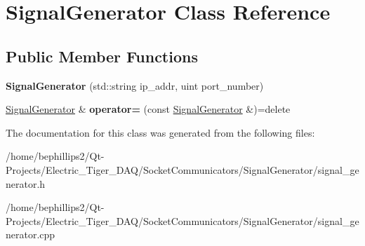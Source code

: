 \hypertarget{class_signal_generator}{}\section{Signal\+Generator Class Reference}
\label{class_signal_generator}
\subsection*{Public Member Functions}
\begin{DoxyCompactItemize}
\item 
{\bfseries Signal\+Generator} (std\+::string ip\+\_\+addr, uint port\+\_\+number)\hypertarget{class_signal_generator_a8e6b4d36b320d50961f83761c5811567}{}\label{class_signal_generator_a8e6b4d36b320d50961f83761c5811567}

\item 
\hyperlink{class_signal_generator}{Signal\+Generator} \& {\bfseries operator=} (const \hyperlink{class_signal_generator}{Signal\+Generator} \&)=delete\hypertarget{class_signal_generator_a4ee427365a76d62d3645f707cf1baf72}{}\label{class_signal_generator_a4ee427365a76d62d3645f707cf1baf72}

\end{DoxyCompactItemize}


The documentation for this class was generated from the following files\+:\begin{DoxyCompactItemize}
\item 
/home/bephillips2/\+Qt-\/\+Projects/\+Electric\+\_\+\+Tiger\+\_\+\+D\+A\+Q/\+Socket\+Communicators/\+Signal\+Generator/signal\+\_\+generator.\+h\item 
/home/bephillips2/\+Qt-\/\+Projects/\+Electric\+\_\+\+Tiger\+\_\+\+D\+A\+Q/\+Socket\+Communicators/\+Signal\+Generator/signal\+\_\+generator.\+cpp\end{DoxyCompactItemize}
